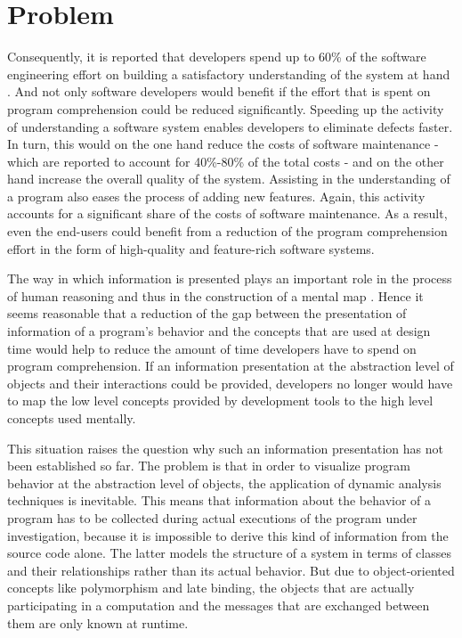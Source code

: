 \section{Problem}
Consequently, it is reported that developers spend up to 60\% of the software engineering effort on building a satisfactory understanding of the system at hand \cite{corbi_program_1989, basili_evolving_1997, ducasse_class_2005, rothlisberger_feature_2007, cornelissen_execution_2008}.
And not only software developers would benefit if the effort that is spent on program comprehension could be reduced significantly.
Speeding up the activity of understanding a software system enables developers to eliminate defects faster.
In turn, this would on the one hand reduce the costs of software maintenance - which are reported to account for 40\%-80\% of the total costs \cite{glass_frequently_2001} - and on the other hand increase the overall quality of the system.
Assisting in the understanding of a program also eases the process of adding new features.
Again, this activity accounts for a significant share of the costs of software maintenance.
As a result, even the end-users could benefit from a reduction of the program comprehension effort in the form of high-quality and feature-rich software systems.

The way in which information is presented plays an important role in the process of human reasoning and thus in the construction of a mental map \cite{diehl_software_2007}.
Hence it seems reasonable that a reduction of the gap between the presentation of information of a program's behavior and the concepts that are used at design time would help to reduce the amount of time developers have to spend on program comprehension.
If an information presentation at the abstraction level of objects and their interactions could be provided, developers no longer would have to map the low level concepts provided by development tools to the high level concepts used mentally.

This situation raises the question why such an information presentation has not been established so far.
The problem is that in order to visualize program behavior at the abstraction level of objects, the application of dynamic analysis techniques is inevitable.
This means that information about the behavior of a program has to be collected during actual executions of the program under investigation, because it is impossible to derive this kind of information from the source code alone.
The latter models the structure of a system in terms of classes and their relationships rather than its actual behavior.
But due to object-oriented concepts like polymorphism and late binding, the objects that are actually participating in a computation and the messages that are exchanged between them are only known at runtime.

